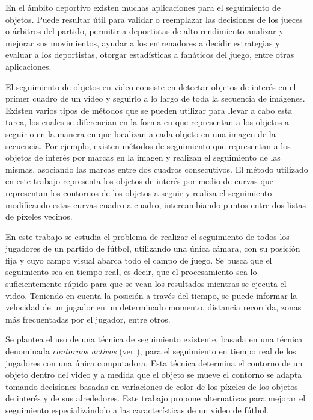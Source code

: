\documentclass[a4paper,11pt]{report}
\begin{document}
En el ámbito deportivo existen muchas aplicaciones para el seguimiento de
objetos. Puede resultar útil para validar o reemplazar las decisiones de los
jueces o árbitros del partido, permitir a deportistas de alto rendimiento
analizar y mejorar sus movimientos, ayudar a los entrenadores a decidir
estrategias y evaluar a los deportistas, otorgar estadísticas a fanáticos del
juego, entre otras aplicaciones.

El seguimiento de objetos en video consiste en detectar objetos de interés en
el primer cuadro de un video y seguirlo a lo largo de toda la secuencia de
imágenes. Existen varios tipos de métodos que se pueden utilizar para llevar
a cabo esta tarea, los cuales se diferencian en la forma en que representan
a los objetos a seguir o en la manera en que localizan a cada objeto en una
imagen de la secuencia. Por ejemplo, existen métodos de seguimiento que
representan a los objetos de interés por marcas en la imagen y realizan el
seguimiento de las mismas, asociando las marcas entre dos cuadros consecutivos.
El método utilizado en este trabajo representa los objetos de interés por
medio de curvas que representan los contornos de los objetos a seguir y
realiza el seguimiento modificando estas curvas cuadro a cuadro,
intercambiando puntos entre dos listas de píxeles vecinos.

En este trabajo se estudia el problema de realizar el seguimiento de todos los
jugadores de un partido de fútbol, utilizando una única cámara, con su posición
fija y cuyo campo visual abarca todo el campo de juego. Se busca que el seguimiento sea en
tiempo real, es decir, que el procesamiento sea lo suficientemente rápido para
que se vean los resultados mientras se ejecuta el video. Teniendo en cuenta la posición
a través del tiempo, se puede informar la velocidad de un jugador en un
determinado momento, distancia recorrida, zonas más frecuentadas por el
jugador, entre otros.

Se plantea el uso de una técnica de seguimiento existente, basada en
una técnica denominada \textit{contornos activos} (ver \cite{fast-level-set}),
para el seguimiento en tiempo real de los jugadores con una única computadora.
Esta técnica determina el contorno de un objeto dentro del video y a medida que
el objeto se mueve el contorno se adapta tomando decisiones basadas en
variaciones de color de los píxeles de los objetos de interés y de sus
alrededores. Este trabajo propone alternativas para mejorar el seguimiento
especializándolo a las características de un video de fútbol.
\end{document}
